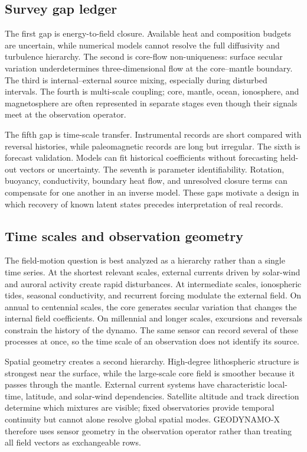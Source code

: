 \documentclass[conference]{IEEEtran}
\begin{document}
\subsection{Survey gap ledger}
The first gap is energy-to-field closure. Available heat and composition budgets are uncertain, while numerical models cannot resolve the full diffusivity and turbulence hierarchy. The second is core-flow non-uniqueness: surface secular variation underdetermines three-dimensional flow at the core--mantle boundary. The third is internal--external source mixing, especially during disturbed intervals. The fourth is multi-scale coupling; core, mantle, ocean, ionosphere, and magnetosphere are often represented in separate stages even though their signals meet at the observation operator.

The fifth gap is time-scale transfer. Instrumental records are short compared with reversal histories, while paleomagnetic records are long but irregular. The sixth is forecast validation. Models can fit historical coefficients without forecasting held-out vectors or uncertainty. The seventh is parameter identifiability. Rotation, buoyancy, conductivity, boundary heat flow, and unresolved closure terms can compensate for one another in an inverse model. These gaps motivate a design in which recovery of known latent states precedes interpretation of real records.

\subsection{Time scales and observation geometry}
The field-motion question is best analyzed as a hierarchy rather than a single time series. At the shortest relevant scales, external currents driven by solar-wind and auroral activity create rapid disturbances. At intermediate scales, ionospheric tides, seasonal conductivity, and recurrent forcing modulate the external field. On annual to centennial scales, the core generates secular variation that changes the internal field coefficients. On millennial and longer scales, excursions and reversals constrain the history of the dynamo. The same sensor can record several of these processes at once, so the time scale of an observation does not identify its source.

Spatial geometry creates a second hierarchy. High-degree lithospheric structure is strongest near the surface, while the large-scale core field is smoother because it passes through the mantle. External current systems have characteristic local-time, latitude, and solar-wind dependencies. Satellite altitude and track direction determine which mixtures are visible; fixed observatories provide temporal continuity but cannot alone resolve global spatial modes. GEODYNAMO-X therefore uses sensor geometry in the observation operator rather than treating all field vectors as exchangeable rows.
\end{document}
